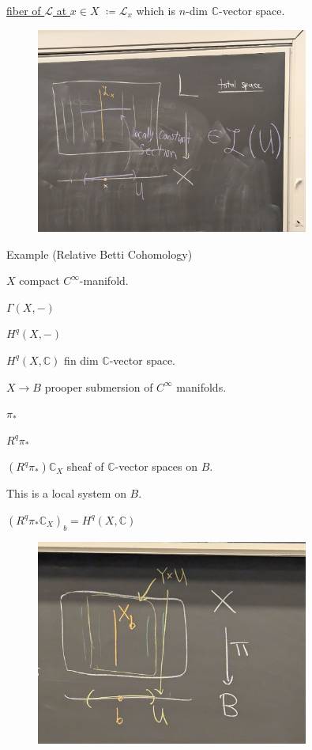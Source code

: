 \documentclass{article}
\theoremstyle{definition}
\begin{document}
    \underline{fiber of \(\mathcal{L}\) at \(x\in X\)} \(\coloneqq \mathcal{L}_x\) which is \(n\)-dim \(\mathbb{C}\)-vector space.
    
    \begin{figure}[H]
        \centering
        \includegraphics[width=0.8\textwidth]{img/fiberL}
    \end{figure}

    Example (Relative Betti Cohomology)

    \(X\) compact \(C^{\infty}\)-manifold.

    \(\Gamma (X,-)\) 

    \(H^q(X,-)\)

    \(H^q(X,\mathbb{C})\) fin dim \(\mathbb{C}\)-vector space.

    \(X \to B\) prooper submersion of \(C^{\infty}\) manifolds.

    \(\pi_{\ast}\) 

    \(R^q \pi_{\ast}\) 

    \((R^q \pi_{\ast}) \mathbb{C}_X\) sheaf of \(\mathbb{C}\)-vector spaces  on \(B\).

    This is a local system on \(B\).

    \((R^q \pi_*\mathbb{C}_X)_b = H^q(X,\mathbb{C})\)

    \begin{figure}[H]
        \centering
        \includegraphics[width=0.8\textwidth]{img/betticohom}
    \end{figure}
\end{document}
